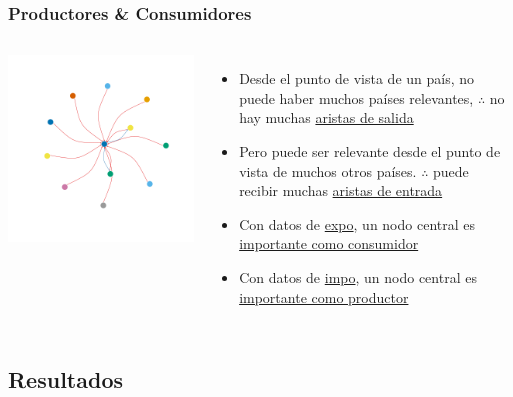 \documentclass[compress]{beamer}
\begin{document}
\begin{frame}
\frametitle{Productores \& Consumidores}	
\begin{columns}
\includegraphics[width=\linewidth]{toy_graph1}

\begin{itemize}[label=\faRebel]
	\item Desde el punto de vista de un país, no puede haber muchos países relevantes, $\therefore$ no hay muchas \underline{aristas de salida}
	\item Pero puede ser relevante desde el punto de vista de muchos otros países.
	$\therefore$ puede recibir muchas \underline{aristas de entrada}
	\item Con datos de \underline{expo}, un nodo central es \underline{importante como consumidor}
	\item Con datos de \underline{impo}, un nodo central es \underline{importante como productor}
\end{itemize}	
\end{columns}	
\end{frame}

\subsection{Resultados}
\end{document}
